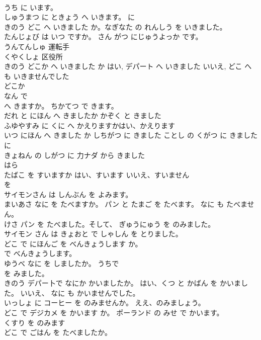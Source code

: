 \documentclass[8pt]{extreport}
\begin{document}
\begin{CJK}{UTF8}{min}
\\	うち に います。	
\\	しゅうまつ に ときょう へ いきます。	に 
\\	きのう どこ へ いきました か。なぎなた の れんしう を いきました。	
\\	たんじょび は いつ ですか。	さん がつ にじゅうよっか です。
\\	うんてんしゅ	運転手
\\	くやくしょ	区役所
\\	きのう どこか へ いきました か はい, デパート へ いきました いいえ, どこ へ も いきませんでした	
\\	どこか 
\\	なん で 
\\	へ きますか。 ちかてつ で きます。	
\\	だれ と にほん へ きましたか かぞく と きました	
\\	ふゆやすみ に くに へ かえりますかはい、かえります	
\\	いつ にほん へ きました か しちがつ に きました ことし の くがつ に きました	に 
\\	きょねん の しがつ に 力ナダ から きました	
\\	はら	
\\	たばこ を すいますか はい、すいます いいえ、すいません	
\\	を 
\\	サイモンさん は しんぶん を よみます。	
\\	まいあさ なに を たべますか。 パン と たまご を たべます。 なに も たべません。	
\\	けさ パン を たべました。そして、 ぎゅうにゅう を のみました。	
\\	サイモン さん は きょおと で しゃしん を とりました。	
\\	どこ で にほんご を べんきょうします か。 
\\	で べんきょうします。	
\\	ゆうべ なに を しましたか。 うちで 
\\	を みました。	
\\	きのう デパー卜で なにか かいましたか。 はい、くつ と かばん を かいました。 いいえ、 なに も かいませんでした。	
\\	いっしょ に コーヒー を のみませんか。 ええ、のみましょう。	
\\	どこ で デジカメ を かいます か。 ポーランド の みせ で かいます。	
\\	くすり を のみます	
\\	どこ で ごはん を たべましたか。	

\end{CJK}
\end{document}
